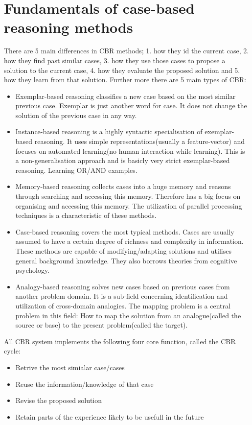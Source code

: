 \documentclass[11pt, letterpaper]{report}
\numberwithin{equation}{section}
\begin{document}
\section{Fundamentals of case-based reasoning methods}
There are 5 main differences in CBR methods; 1. how they id the current case, 2. how
they find past similar cases, 3. how they use those cases to propose a solution to
the current case, 4. how they evaluate the proposed solution and 5. how they
learn from that solution. Further more there are 5 main types of CBR:
\begin{itemize}
\item Exemplar-based reasoning classifies a new case based on the most similar
  previous case. Exemplar is just another word for case. It does not change the
  solution of the previous case in any way.
\item Instance-based reasoning is a highly syntactic specialisation of
  exemplar-based reasoning. It uses simple representations(usually a
  feature-vector) and focuses on automated learning(no human interaction while
  learning). This is a non-generalisation approach and is basicly
  very strict exemplar-based reasoning. Learning OR/AND examples.
\item Memory-based reasoning collects cases into a huge memory and reasons
  through searching and accessing this memory. Therefore has a big focus on
  organising and accessing this memory. The utilization of parallel processing
  techniques is a characteristic of these methods.
\item Case-based reasoning covers the most typical methods. Cases are usually
  assumed to have a certain degree of richness and complexity in information.
  These methods are capable of modifying/adapting solutions and utilises general
  background knowledge. They also borrows theories from cognitive psychology.
\item Analogy-based reasoning solves new cases based on previous cases from
  another problem domain. It is a sub-field concerning identification and
  utilization of cross-domain analogies. The mapping problem is a central
  problem in this field: How to map the solution from an analogue(called the
  source or base) to the present problem(called the target).
\end{itemize}

All CBR system implements the following four core function, called the CBR
cycle:
\begin{itemize}
\item Retrive the most simialar case/cases
\item Reuse the information/knowledge of that case
\item Revise the proposed solution
\item Retain parts of the experience likely to be usefull in the future
\end{itemize}
\end{document}
